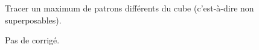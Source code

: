 \begin{exercice*}
   Tracer un maximum de patrons différents du cube (c'est-à-dire non superposables).
\end{exercice*}
\begin{corrige}
   Pas de corrigé.
\end{corrige}